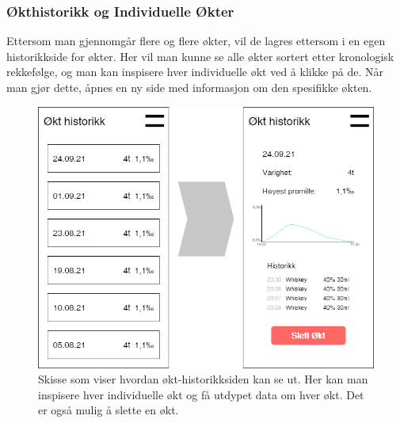 \subsubsection{Økthistorikk og Individuelle Økter}
Ettersom man gjennomgår flere og flere økter, vil de lagres ettersom i en egen historikkside for økter. Her vil man kunne se alle økter sortert etter kronologisk rekkefølge, og man kan inspisere hver individuelle økt ved å klikke på de. Når man gjør dette, åpnes en ny side med informasjon om den spesifikke økten.

\begin{figure}[H]
    \centering
    \includegraphics[scale=0.4]{images/lille_promille_sessions.drawio.png}
    \caption{Skisse som viser hvordan økt-historikksiden kan se ut. Her kan man inspisere hver individuelle økt og få utdypet data om hver økt. Det er også mulig å slette en økt.}
\end{figure}